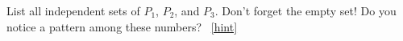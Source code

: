 \documentclass{book}
\begin{document}
\setcounter{project}{132}
\addtocounter{project}{-1}
\begin{activity}[]\label{activity-125}
\hypertarget{p-936}{}%
List all independent sets of \(P_1\), \(P_2\), and \(P_3\).  Don't forget the empty set! Do you notice a pattern among these numbers?%
~\hfill{\tiny\hyperlink{a-132}{[hint]}\hypertarget{q-132}{}}\end{activity}
\end{document}
